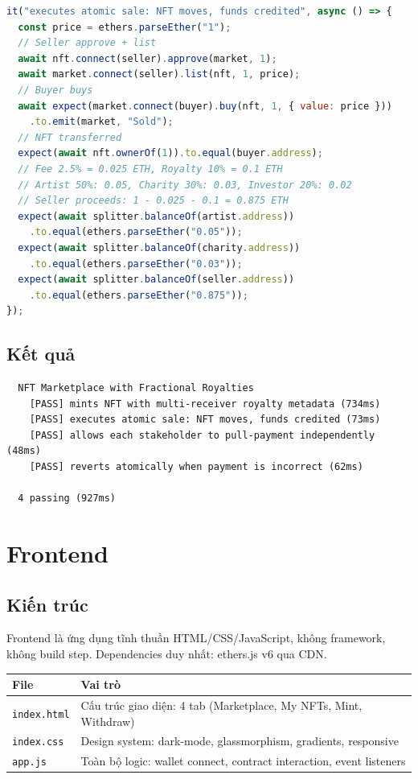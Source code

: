 \documentclass[12pt,a4paper,oneside]{report}
\theoremstyle{plain}
\theoremstyle{definition}
\theoremstyle{remark}
\begin{document}
\begin{lstlisting}[language=JavaScript,caption={Test kiểm tra chia tiền đúng sau atomic buy.}]
it("executes atomic sale: NFT moves, funds credited", async () => {
  const price = ethers.parseEther("1");
  // Seller approve + list
  await nft.connect(seller).approve(market, 1);
  await market.connect(seller).list(nft, 1, price);
  // Buyer buys
  await expect(market.connect(buyer).buy(nft, 1, { value: price }))
    .to.emit(market, "Sold");
  // NFT transferred
  expect(await nft.ownerOf(1)).to.equal(buyer.address);
  // Fee 2.5% = 0.025 ETH, Royalty 10% = 0.1 ETH
  // Artist 50%: 0.05, Charity 30%: 0.03, Investor 20%: 0.02
  // Seller proceeds: 1 - 0.025 - 0.1 = 0.875 ETH
  expect(await splitter.balanceOf(artist.address))
    .to.equal(ethers.parseEther("0.05"));
  expect(await splitter.balanceOf(charity.address))
    .to.equal(ethers.parseEther("0.03"));
  expect(await splitter.balanceOf(seller.address))
    .to.equal(ethers.parseEther("0.875"));
});
\end{lstlisting}

\section{Kết quả}

\begin{verbatim}
  NFT Marketplace with Fractional Royalties
    [PASS] mints NFT with multi-receiver royalty metadata (734ms)
    [PASS] executes atomic sale: NFT moves, funds credited (73ms)
    [PASS] allows each stakeholder to pull-payment independently (48ms)
    [PASS] reverts atomically when payment is incorrect (62ms)

  4 passing (927ms)
\end{verbatim}

\chapter{Frontend}
\label{chap:frontend}

\section{Kiến trúc}

Frontend là ứng dụng tĩnh thuần HTML/CSS/JavaScript, không framework, không build step.
Dependencies duy nhất: ethers.js v6 qua CDN.

\begin{table}[H]
\centering\small
\begin{tabular}{l p{9cm}}
\toprule
\textbf{File} & \textbf{Vai trò} \\
\midrule
\texttt{index.html} & Cấu trúc giao diện: 4 tab (Marketplace, My NFTs, Mint, Withdraw) \\
\texttt{index.css} & Design system: dark-mode, glassmorphism, gradients, responsive \\
\texttt{app.js} & Toàn bộ logic: wallet connect, contract interaction, event listeners \\
\bottomrule
\end{tabular}
\end{table}
\end{document}
